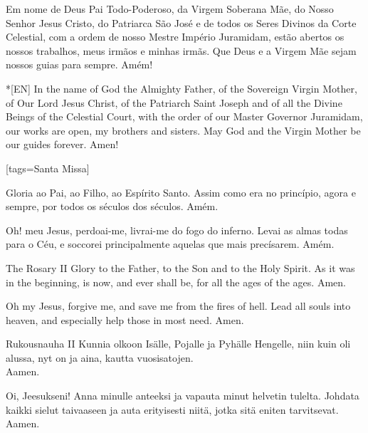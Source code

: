 \begin{intersong}
  \begin{passage}[PT]{}
    Em nome de Deus Pai Todo-Poderoso, da Virgem Soberana Mãe,
    do Nosso Senhor Jesus Cristo, do Patriarca São José e de
    todos os Seres Divinos da Corte Celestial, com a ordem de
    nosso Mestre Império Juramidam, estão abertos os nossos
    trabalhos, meus irmãos e minhas irmãs. Que Deus e a Virgem Mãe
    sejam nossos guias para sempre. Amém!
  \end{passage}
  \begin{passage}*[EN]{}
    In the name of God the Almighty Father, of the Sovereign Virgin
    Mother, of Our Lord Jesus Christ, of the Patriarch Saint Joseph and of
    all the Divine Beings of the Celestial Court, with the order of our Master
    Governor Juramidam, our works are open, my brothers and sisters.
    May God and the Virgin Mother be our guides forever. Amen!
  \end{passage}
  \vfill
\end{intersong}


[tags={Santa Missa}]
  \begin{passage}[PT]{}
    Gloria ao Pai, ao Filho, ao Espírito Santo.
    Assim como era no princípio, agora e sempre,
    por todos os séculos dos séculos. Amém.
    \par
    Oh! meu Jesus, perdoai-me, livrai-me do fogo do
    inferno. Levai as almas todas para o Céu, e soccorei
    principalmente aquelas que mais precísarem. Amém.
  \end{passage}
  \begin{passage}[EN]{The Rosary II}
    Glory to the Father, to the Son and to the Holy Spirit.
    As it was in the beginning, is now, and ever shall be,
    for all the ages of the ages. Amen.
    \par
    Oh my Jesus, forgive me, and save me from the fires
    of hell. Lead all souls into heaven, and especially
    help those in most need. Amen.
  \end{passage}
  \begin{passage}[FI]{Rukousnauha II}
    Kunnia olkoon Isälle, Pojalle ja Pyhälle Hengelle,
    niin kuin oli alussa, nyt on ja aina,
    kautta vuosisatojen.\\
    Aamen.
    \par
    Oi, Jeesukseni! Anna minulle anteeksi ja vapauta
    minut helvetin tulelta. Johdata kaikki
    sielut taivaaseen ja auta erityisesti niitä,
    jotka sitä eniten tarvitsevat. Aamen.
  \end{passage}
\endsong



